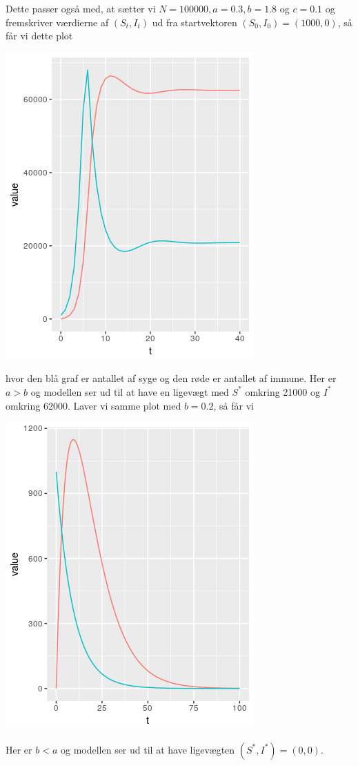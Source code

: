 \documentclass[12pt]{article}
\begin{document}
Dette passer også med, at sætter vi $N=100000, a=0.3, b=1.8$ og $c=0.1$ og fremskriver værdierne af $(S_t, I_t)$ ud fra startvektoren $(S_0, I_0)=(1000,0)$, så får vi dette plot
\begin{center}
\includegraphics[scale=0.5]{q3p1.png}
\end{center}
hvor den blå graf er antallet af syge og den røde er antallet af immune. Her er $a>b$ og modellen ser ud til at have en ligevægt med $S^*$ omkring 21000 og $I^*$ omkring 62000. Laver vi samme plot med $b=0.2$, så får vi
\begin{center}
\includegraphics[scale=0.5]{q3p2.png}
\end{center}
Her er $b<a$ og modellen ser ud til at have ligevægten $(S^*, I^*)=(0,0)$. 
\end{document}
